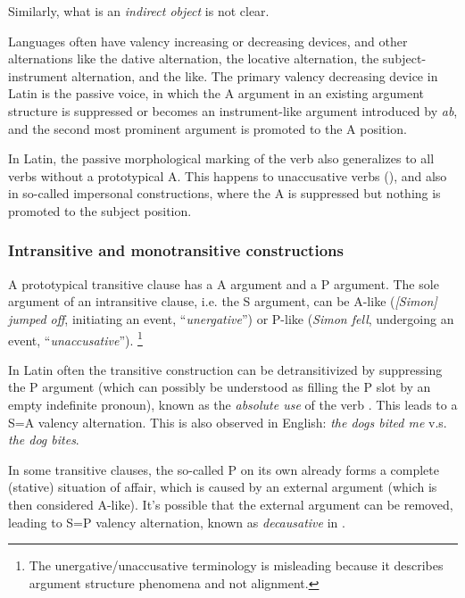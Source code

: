 \documentclass[a4paper, oneside, 12pt]{report}
\newcommand*{\citesec}[1]{\S~{#1}}
\newcommand*{\citepage}[1]{p.~{#1}}
\newcommand*{\term}[1]{\emph{#1}}
\newcommand{\form}[1]{\emph{#1}}
\begin{document}
Similarly, what is an \term{indirect object} is not clear.

Languages often have valency increasing or decreasing devices,
and other alternations like the dative alternation, the locative alternation, the subject-instrument alternation, and the like.
The primary valency decreasing device in Latin is the passive voice,
in which the A argument in an existing argument structure is suppressed or becomes an instrument-like argument introduced by \form{ab},
and the second most prominent argument is promoted to the A position.

In Latin, the passive morphological marking of the verb
also generalizes to all verbs without a prototypical A.
This happens to unaccusative verbs
(),
and also in so-called impersonal constructions,
where the A is suppressed but nothing is promoted to the subject position.




\subsubsection{Intransitive and monotransitive constructions}
\label{sec:grammatical.clause.core.transitive}

A prototypical transitive clause has a A argument and a P argument.
The sole argument of an intransitive clause, i.e. the S argument,
can be A-like (\form{[Simon] jumped off}, initiating an event, ``\term{unergative}'')
or P-like (\form{Simon fell}, undergoing an event, ``\term{unaccusative}'').%
\footnote{
    The unergative/unaccusative terminology is misleading because it describes argument structure phenomena and not alignment.
}

In Latin often the transitive construction can be detransitivized
by suppressing the P argument
(which can possibly be understood as filling the P slot by an empty indefinite pronoun),
known as the \emph{absolute use} of the verb
\citep[\citesec{9.16}]{Pinkster1}.
This leads to a S=A valency alternation. 
This is also observed in English: \form{the dogs bited me} v.s. \form{the dog bites}.

In some transitive clauses,
the so-called P on its own already forms a complete (stative) situation of affair,
which is caused by an external argument (which is then considered A-like). 
It's possible that the external argument can be removed,
leading to S=P valency alternation, known as \term{decausative} in \citet[\citepage{281}]{Pinkster1}.
\end{document}
